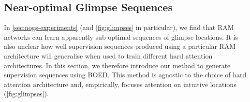 \subsection{Near-optimal Glimpse Sequences}  \label{sec:nogs-nogs}

In \cref{sec:nogs-experiments} (and \cref{fig:glimpses} in particular), we find that
RAM networks can learn apparently sub-optimal sequences of glimpse locations. It
is also unclear how well supervision sequences produced using a particular RAM
architecture will generalise when used to train different hard attention
architectures. In this section, we therefore introduce our method to generate
supervision sequences using BOED. This method is agnostic to the choice of hard
attention architecture and, empirically, focuses attention on intuitive
locations (\cref{fig:glimpses}).

